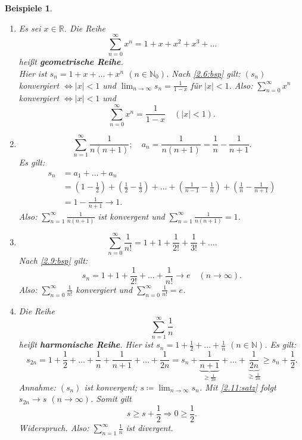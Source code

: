 \documentclass[12pt]{extreport} %
\newcommand{\N}{\mathbb{N}}
\newcommand{\R}{\mathbb{R}}
\theoremstyle{named}
\theoremstyle{itshape}
\theoremstyle{normal}
\newtheorem*{beispiele}{Beispiele}
\begin{document}
 
\begin{beispiele} ~\
	\begin{enumerate}
		\item Es sei $x \in \R$. Die Reihe
		$$\sum_{n=0}^{\infty} x^{n} = 1 + x + x^{2} + x^3 + \dotsc$$ 
		hei{\ss}t \textbf{geometrische Reihe}. \\
			Hier ist $s_{n} = 1 + x + \dotsc + x^{n}$ $(n \in \N_0)$. Nach \ref{2.6:bsp} gilt: $(s_{n})$ konvergiert $\iff |x| < 1$ und 
			$\lim_{n \to \infty} s_{n} = \frac{1}{1 - x}$ für $|x| < 1$. Also: $\sum_{n=0}^{\infty} x^{n}$ konvergiert $\iff |x| < 1$ und 
			$$\sum_{n=0}^{\infty} x^{n} = \frac{1}{1 - x} \quad (|x| < 1).$$
		\item $$\sum_{n=1}^{\infty} \frac{1}{n(n+1)}; \quad a_{n} = \frac{1}{n(n+1)} = \frac{1}{n} - \frac{1}{n+1}.$$ Es gilt:
			\begin{align*}
				s_{n} & = a_{1} + \dotsc + a_{n} \\
						& = (1 - \frac{1}{2}) + (\frac{1}{2} - \frac{1}{3}) + \dotsc + (\frac{1}{n-1} - \frac{1}{n}) + (\frac{1}{n} - \frac{1}{n+1}) \\
						& = 1 - \frac{1}{n+1} \rightarrow 1.
			\end{align*}
			Also: $\sum_{n=1}^{\infty} \frac{1}{n(n+1)}$ ist konvergent und $\sum_{n=1}^{\infty} \frac{1}{n(n+1)} = 1$.
		\item   $$\sum_{n=0}^{\infty} \frac{1}{n!} = 1 + 1 + \frac{1}{2!} + \frac{1}{3!} + \dotsc.$$ Nach \ref{2.9:bsp} gilt:
		        $$s_{n} = 1 + 1 + \frac{1}{2!} + \dotsc + \frac{1}{n!} \rightarrow e \quad (n \to \infty).$$
			Also: $\sum_{n = 0}^{\infty} \frac{1}{n!}$ konvergiert und $\sum_{n=0}^{\infty} \frac{1}{n!} = e$.
		\item Die Reihe $$\sum_{n=1}^{\infty} \frac{1}{n}$$ hei{\ss}t \textbf{harmonische Reihe}. Hier ist $s_{n} = 1 + \frac{1}{2} + \dotsc + \frac{1}{n}$ $(n \in \N)$. 
		        Es gilt:
			$$ s_{2n} = 1 + \frac{1}{2} + \dotsc + \frac{1}{n} + \frac{1}{n+1} + \dotsc + \frac{1}{2n} 
			= s_{n} + \underbrace{\frac{1}{n+1}}_{\geq \frac{1}{2n}} + \dotsc + \underbrace{\frac{1}{2n}}_{\geq \frac{1}{2n}} \geq s_{n} + \frac{1}{2}. $$
			Annahme: $(s_{n})$ ist konvergent; $s \coloneqq \lim_{n \to\infty} s_{n}$. Mit \ref{2.11:satz} folgt $s_{2n} \rightarrow s$ $(n \to \infty)$. Somit gilt
			$$s \geq s + \frac{1}{2} \Rightarrow 0 \geq \frac{1}{2}. $$
			Widerspruch. Also: $\sum_{n=1}^{\infty} \frac{1}{n}$ ist divergent.
	\end{enumerate}	
\end{beispiele}
\end{document}
